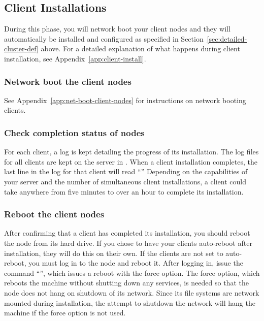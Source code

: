 
\subsection{Client Installations}

During this phase, you will network boot your client nodes and they
will automatically be installed and configured as specified in
Section~\ref{sec:detailed-cluster-def} above. For a detailed
explanation of what happens during client installation, see
Appendix~\ref{app:client-install}.

\subsubsection{Network boot the client nodes}

See Appendix~\ref{app:net-boot-client-nodes} for instructions on
network booting clients.

\subsubsection{Check completion status of nodes}

For each client, a log is kept detailing the progress of its
installation. The log files for all clients are kept on the server in
. When a client installation completes, the
last line in the log for that client will read ``'' Depending on the capabilities of
your server and the number of simultaneous client installations, a
client could take anywhere from five minutes to over an hour to
complete its installation.
  
\subsubsection{Reboot the client nodes}

After confirming that a client has completed its installation, you
should reboot the node from its hard drive. If you chose to have your
clients auto-reboot after installation, they will do this on their
own. If the clients are not set to auto-reboot, you must log in to the
node and reboot it. After logging in, issue the command ``'', which issues a reboot with the force option. The force
option, which reboots the machine without shutting down any services,
is needed so that the node does not hang on shutdown of its network.
Since its file systems are network mounted during installation, the
attempt to shutdown the network will hang the machine if the force
option is not used. 

